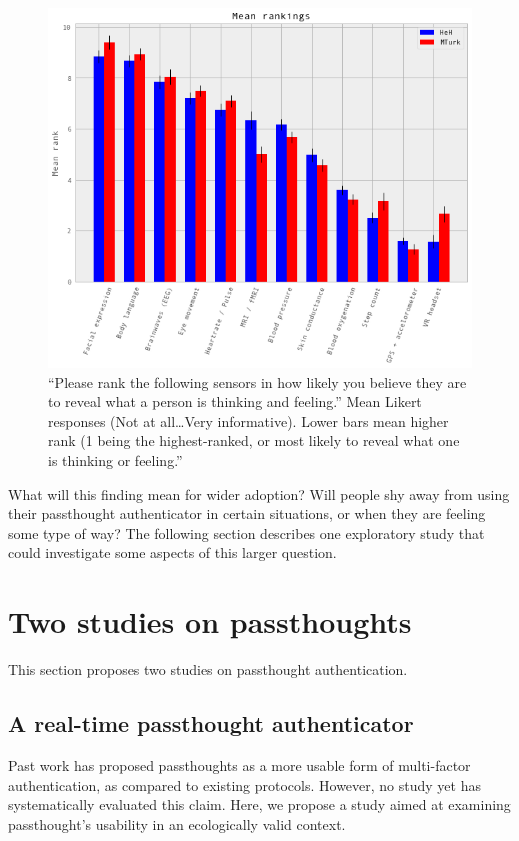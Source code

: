 \documentclass[sigconf]{acmart}
\begin{document}
\label{fig:rank}
\begin{figure}
\centering
\includegraphics[width=.9\linewidth]{./figures/rankings.png}
\caption{``Please rank the following sensors in how likely you believe they are to reveal what a person is thinking and feeling.'' Mean Likert responses (Not at all\ldots{}Very informative). Lower bars mean higher rank (1 being the highest-ranked,  or most likely to reveal what one is thinking or feeling.''}
\end{figure}

What will this finding mean for wider adoption? 
Will people shy away from using their passthought authenticator in certain situations, or when they are feeling some type of way?
The following section describes one exploratory study that could investigate some aspects of this larger question.

\section{Two studies on passthoughts}
\label{sec:org0426e70}

This section proposes two studies on passthought authentication.

\subsection{A real-time passthought authenticator}
\label{sec:org85dc730}

Past work has proposed passthoughts as a more usable form of multi-factor authentication,
as compared to existing protocols.
However, no study yet has systematically evaluated this claim.
Here, we propose a study aimed at 
examining passthought's usability in an ecologically valid context.
\end{document}
